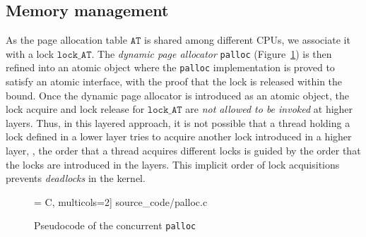 {\subsection{Memory management}
\label{sec:con:mem}


As the page allocation table $\texttt{AT}$ is shared among different CPUs, 
we associate it with a lock $\texttt{lock\_AT}$.
The \emph{dynamic page allocator}
\texttt{palloc} (\cf Figure~\ref{fig:exp:palloc}) is then refined into an atomic object where
the \texttt{palloc} implementation is proved to satisfy an atomic interface,
with the proof that the lock is released within the bound.
Once the dynamic page allocator is introduced as
 an atomic object, the lock acquire and lock release 
for $\texttt{lock\_AT}$
are \emph{not allowed to be invoked} at higher layers. 
Thus, in this layered approach, it is not possible
that a thread holding a lock defined in a lower layer tries to acquire another lock
introduced in a higher layer, \ie, the order that a thread acquires different
locks is guided by the order that the locks are introduced in the layers.
This implicit order of lock acquisitions prevents \emph{deadlocks} in the
{\cCTOS} kernel.

\begin{figure}[t]
 = C, multicols=2] {source_code/palloc.c}
\caption{Pseudocode of the concurrent \texttt{palloc}}
\label{fig:exp:palloc}
\hrulefill
\end{figure}



}
